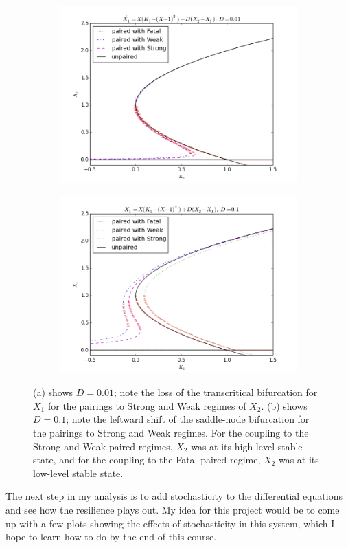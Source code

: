 \documentclass[12pt]{article}
\begin{document}
\begin{figure}[H]
\centering
\begin{subfigure}{.5\textwidth}
  \centering
	\includegraphics[scale=0.4]{shifted_bifds_001D.png}
	\end{subfigure}%
\begin{subfigure}{.5\textwidth}
  \centering
	\includegraphics[scale=0.4]{shifted_bifds_01D.png}
\end{subfigure}
\caption{(a) shows $D=0.01$; note the loss of the transcritical bifurcation for $X_1$ for the pairings to Strong and Weak regimes of $X_2$. (b) shows $D=0.1$; note the leftward shift of the saddle-node bifurcation for the pairings to Strong and Weak regimes. For the coupling to the Strong and Weak paired regimes, $X_2$ was at its high-level stable state, and for the coupling to the Fatal paired regime, $X_2$ was at its low-level stable state.}
\label{comparing_bifds} 
\end{figure}


The next step in my analysis is to add stochasticity to the differential equations and see how the resilience plays out.  My idea for this project would be to come up with a few plots showing the effects of stochasticity in this system, which I hope to learn how to do by the end of this course. 
\end{document}

